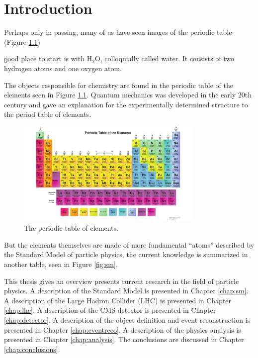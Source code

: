 \chapter{Introduction}

Perhaps only in passing, many of us have seen images of the periodic table (Figure \ref{fig:periodictable}) 

 good place to start is with H$_{2}$O, colloquially called water. It consists of two hydrogen atoms and one oxygen atom.

The objects responsible for chemistry are found in the periodic table of the elements seen in Figure \ref{fig:periodictable}. Quantum mechanics was developed in the early 20th century and gave an explanation for the experimentally determined structure to the period table of elements.

\begin{figure}[htbp]
\centering
\includegraphics[width=0.8\textwidth]{figs/PeriodicTable.pdf}
\caption{The periodic table of elements.}
\label{fig:periodictable}
\end{figure}

But the elements themselves are made of more fundamental ``atoms'' described by the Standard Model of particle physics, the current knowledge is summarized in another table, seen in Figure \ref{fig:sm}.

This thesis gives an overview  presents current research in the field of particle physics. A description of the Standard Model is presented in Chapter \ref{chap:sm}. A description of the Large Hadron Collider (LHC) is presented in Chapter \ref{chap:lhc}. A description of the CMS detector is presented in Chapter \ref{chap:detector}. A description of the object definition and event reconstruction is presented in Chapter \ref{chap:eventreco}.  A description of the physics analysis is presented in Chapter \ref{chap:analysis}. The conclusions are discussed in Chapter \ref{chap:conclusions}.
